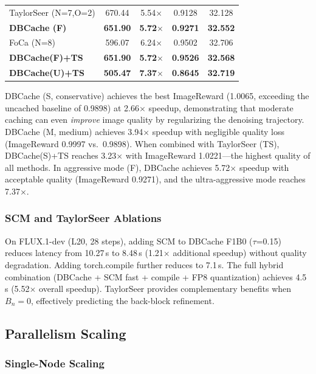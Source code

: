 \documentclass[10pt]{article}
\begin{document}
\begin{table}[htbp]
{\begin{tabular}{lcccc}
TaylorSeer (N=7,O=2) & 670.44 & 5.54$\times$ & 0.9128 & 32.128 \\
\textbf{DBCache (F)} & \textbf{651.90} & \textbf{5.72$\times$} & \textbf{0.9271} & \textbf{32.552} \\
FoCa (N=8) & 596.07 & 6.24$\times$ & 0.9502 & 32.706 \\
\textbf{DBCache(F)+TS} & \textbf{651.90} & \textbf{5.72$\times$} & \textbf{0.9526} & \textbf{32.568} \\
\textbf{DBCache(U)+TS} & \textbf{505.47} & \textbf{7.37$\times$} & \textbf{0.8645} & \textbf{32.719} \\
\bottomrule
\end{tabular}
}
\end{table}

DBCache (S, conservative) achieves the best ImageReward (1.0065, exceeding the uncached baseline of 0.9898) at 2.66$\times$ speedup, demonstrating that moderate caching can even \textit{improve} image quality by regularizing the denoising trajectory. DBCache (M, medium) achieves 3.94$\times$ speedup with negligible quality loss (ImageReward 0.9997 vs.~0.9898). When combined with TaylorSeer (TS), DBCache(S)+TS reaches 3.23$\times$ with ImageReward 1.0221---the highest quality of all methods. In aggressive mode (F), DBCache achieves 5.72$\times$ speedup with acceptable quality (ImageReward 0.9271), and the ultra-aggressive mode reaches 7.37$\times$.

\subsubsection{SCM and TaylorSeer Ablations}

On FLUX.1-dev (L20, 28 steps), adding SCM to DBCache F1B0 ($\tau$=0.15) reduces latency from 10.27\,s to 8.48\,s (1.21$\times$ additional speedup) without quality degradation. Adding torch.compile further reduces to 7.1\,s. The full hybrid combination (DBCache + SCM fast + compile + FP8 quantization) achieves 4.5\,s (5.52$\times$ overall speedup). TaylorSeer provides complementary benefits when $B_n=0$, effectively predicting the back-block refinement.

\subsection{Parallelism Scaling}

\subsubsection{Single-Node Scaling}
\end{document}
